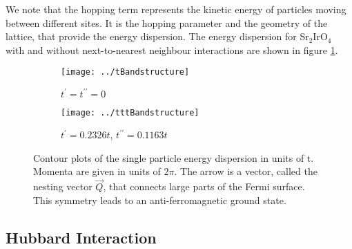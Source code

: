 We note that the hopping term represents the kinetic energy of particles moving between different sites. 
It is the hopping parameter and the 
geometry of the lattice, that provide the energy dispersion. 
The energy dispersion for Sr$_2$IrO$_4$  with and without next-to-nearest neighbour interactions are shown in figure \ref{fig:energie_dispersion}.



\begin{figure} \centering
\begin{subfigure}{0.49\linewidth} \centering
 \texttt{[image: ../tBandstructure]}
 \caption{$ t^{\prime}=t^{\prime \prime} =0$ }
\end{subfigure}
\begin{subfigure}{0.49\linewidth}
\texttt{[image: ../tttBandstructure]}
  \caption{ $t^{\prime}= 0.2326t$, $t^{\prime \prime} = 0.1163t$}
\end{subfigure}
\caption{
Contour plots of the single particle energy dispersion in units of t. Momenta are given in units of $2\pi$.
The arrow is a vector, called the nesting vector $\vec Q$, that connects large parts of the
Fermi surface. This symmetry leads to an anti-ferromagnetic ground state.}
\label{fig:energie_dispersion}
\end{figure}




\subsection{Hubbard Interaction}

